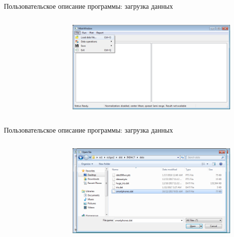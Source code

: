 \documentclass[aspectratio=169,tikz]{beamer}
\begin{document}
	\begin{frame}{Пользовательское описание программы: загрузка данных}
	\begin{columns}
		\begin{figure}[T] %
			\centering
			
		\end{figure}
	\begin{figure}[T] %
		\centering
		\includegraphics[width=0.95\linewidth]{img/diploma/instruction/open-file-menu}
	\end{figure}

	\end{columns}
	\end{frame}


	\begin{frame}{Пользовательское описание программы: загрузка данных}
	\begin{columns}
		\column{0.2\linewidth}
		\begin{figure}[T] %
			\centering
			
		\end{figure}
		\column{0.8\linewidth}
		\begin{figure}[T] %
			\centering
			\includegraphics[width=0.95\linewidth]{img/diploma/instruction/open-smartphones-2}
		\end{figure}
	\end{columns}
	\end{frame}
	
\end{document}

